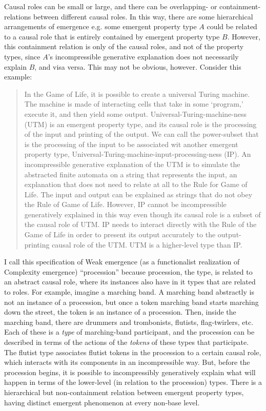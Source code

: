 \documentclass{article}
\newcommand{\ti}[1]{\textit{#1}}
\begin{document}
Causal roles can be small or large, and there can be overlapping- or containment-relations between different causal roles. In this way, there are some hierarchical arrangements of emergence e.g. some emergent property type $A$ could be related to a causal role that is entirely contained by emergent property type $B$. However, this containment relation is only of the causal roles, and not of the property types, since $A$'s incompressible generative explanation does not necessarily explain $B$, and visa versa. This may not be obvious, however. Consider this example:

\begin{quote}
In the Game of Life, it is possible to create a universal Turing machine. The machine is made of interacting cells that take in some `program,' execute it, and then yield some output. Universal-Turing-machine-ness (UTM) is an emergent property type, and its causal role is the processing of the input and printing of the output. We can call the power-subset that is the processing of the input to be associated wit another emergent property type, Universal-Turing-machine-input-processing-ness (IP). An incompressible generative explanation of the UTM is to simulate the abstracted finite automata on a string that represents the input, an explanation that does not need to relate at all to the Rule for Game of Life. The input and output can be explained as strings that do not obey the Rule of Game of Life. However, IP cannot be incompressible generatively explained in this way even though its causal role is a subset of the causal role of UTM. IP needs to interact directly with the Rule of the Game of Life in order to present its output accurately to the output-printing causal role of the UTM. UTM is a higher-level type than IP.
\end{quote}

I call this specification of Weak emergence (as a functionalist realization of Complexity emergence) ``procession'' because procession, the type, is related to an abstract causal role, where its instances also have in it types that are related to roles. For example, imagine a marching band. A marching band abstractly is not an instance of a procession, but once a token marching band starts marching down the street, the token is an instance of a procession. Then, inside the marching band, there are drummers and trombonists, flutists, flag-twirlers, etc. Each of these is a \ti{type} of marching-band participant, and the procession can be described in terms of the actions of the \ti{tokens} of these types that participate. The flutist type associates flutist tokens in the procession to a certain causal role, which interacts with its components in an incompressible way. But, before the procession begins, it is possible to incompressibly generatively explain what will happen in terms of the lower-level (in relation to the procession) types. There is a hierarchical but non-containment relation between emergent property types, having distinct emergent phenomenon at every non-base level.
\end{document}
